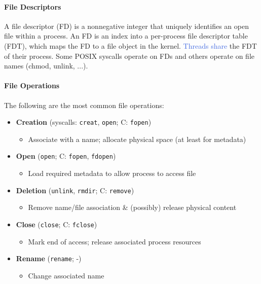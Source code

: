 \documentclass[openany,12pt]{book}
\newcommand{\blue}[1]{\textcolor{RoyalBlue}{#1}}
\begin{document}
\paragraph{File Descriptors} A file descriptor (FD) is a nonnegative integer that uniquely identifies an open file within a process. An FD is an index into a per-process file descriptor table (FDT), which maps the FD to a file object in the kernel. \blue{Threads share} the FDT of their process. Some POSIX syscalls operate on FDs and others operate on file names (chmod, unlink, ...).

\paragraph{File Operations} The following are the most common file operations:
\begin{itemize}
    \item \textbf{Creation} (syscalls: \texttt{creat}, \texttt{open}; C: \texttt{fopen})
    \begin{itemize}
        \item Associate with a name; allocate physical space (at least for metadata)
    \end{itemize}

    \item \textbf{Open} (\texttt{open}; C: \texttt{fopen}, \texttt{fdopen})
    \begin{itemize}
        \item Load required metadata to allow process to access file
    \end{itemize}

    \item \textbf{Deletion} (\texttt{unlink}, \texttt{rmdir}; C: \texttt{remove})
    \begin{itemize}
        \item Remove name/file association \& (possibly) release physical content
    \end{itemize}

    \item \textbf{Close} (\texttt{close}; C: \texttt{fclose})
    \begin{itemize}
        \item Mark end of access; release associated process resources
    \end{itemize}

    \item \textbf{Rename} (\texttt{rename}; -)
    \begin{itemize}
        \item Change associated name
    \end{itemize}


\end{itemize}
\end{document}
